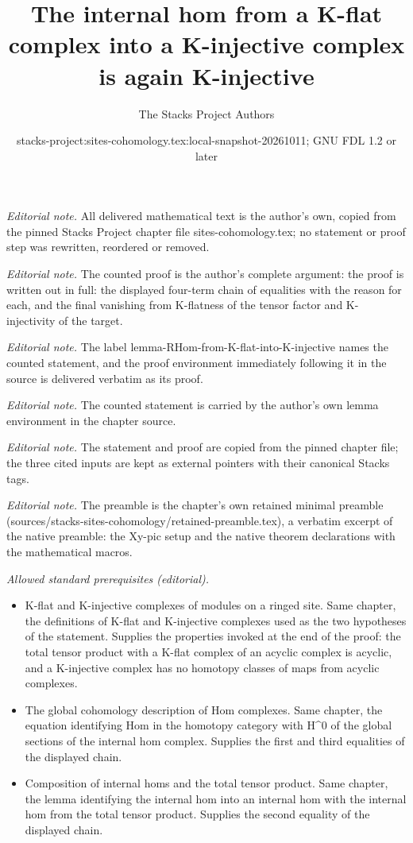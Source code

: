 \documentclass[10pt,a4paper]{amsart}
\title{The internal hom from a K-flat complex into a K-injective complex is again K-injective}
\author{The Stacks Project Authors}
\date{stacks-project:sites-cohomology.tex:local-snapshot-20261011; GNU FDL 1.2 or later}
\theoremstyle{plain}
\theoremstyle{definition}
\theoremstyle{remark}
\numberwithin{equation}{subsection}
\begin{document}
\maketitle
\noindent\textit{Editorial note.} All delivered mathematical text is the author's own, copied from the pinned Stacks Project chapter file sites-cohomology.tex; no statement or proof step was rewritten, reordered or removed.\par\medskip
\noindent\textit{Editorial note.} The counted proof is the author's complete argument: the proof is written out in full: the displayed four-term chain of equalities with the reason for each, and the final vanishing from K-flatness of the tensor factor and K-injectivity of the target.\par\medskip
\noindent\textit{Editorial note.} The label lemma-RHom-from-K-flat-into-K-injective names the counted statement, and the proof environment immediately following it in the source is delivered verbatim as its proof.\par\medskip
\noindent\textit{Editorial note.} The counted statement is carried by the author's own lemma environment in the chapter source.\par\medskip
\noindent\textit{Editorial note.} The statement and proof are copied from the pinned chapter file; the three cited inputs are kept as external pointers with their canonical Stacks tags.\par\medskip
\noindent\textit{Editorial note.} The preamble is the chapter's own retained minimal preamble (sources/stacks-sites-cohomology/retained-preamble.tex), a verbatim excerpt of the native preamble: the Xy-pic setup and the native theorem declarations with the mathematical macros.\par\medskip
\noindent\textit{Allowed standard prerequisites (editorial).}\begin{itemize}
\item K-flat and K-injective complexes of modules on a ringed site. Same chapter, the definitions of K-flat and K-injective complexes used as the two hypotheses of the statement. Supplies the properties invoked at the end of the proof: the total tensor product with a K-flat complex of an acyclic complex is acyclic, and a K-injective complex has no homotopy classes of maps from acyclic complexes.
\item The global cohomology description of Hom complexes. Same chapter, the equation identifying Hom in the homotopy category with H\textasciicircum{}0 of the global sections of the internal hom complex. Supplies the first and third equalities of the displayed chain.
\item Composition of internal homs and the total tensor product. Same chapter, the lemma identifying the internal hom into an internal hom with the internal hom from the total tensor product. Supplies the second equality of the displayed chain.
\end{itemize}\medskip
\end{document}
